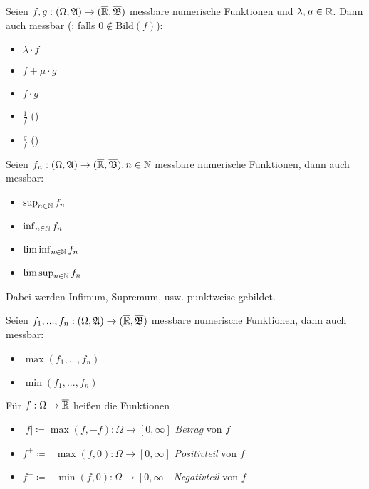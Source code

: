 \documentclass{cheat-sheet}
\newcommand{\ER}{\overline\R} %
\newcommand{\Alg}{\mathfrak{A}} %
\newcommand{\Bor}{\mathfrak{B}} %
\begin{document}
\begin{satz}
  Seien $f, g : (\Omega, \Alg) \to (\ER, \overline{\Bor})$ messbare numerische Funktionen und $\lambda, \mu \in \mathbb{R}$. Dann auch messbar (\ddag: falls $0 \not\in \mathrm{Bild}(f)$):
  \begin{multicols}{5}
    \begin{itemize}
      \item $\lambda \cdot f$
      \item $f + \mu \cdot g$
      \item $f \cdot g$
      \item $\tfrac{1}{f}$ (\ddag)
      \item $\tfrac{g}{f}$ (\ddag)
    \end{itemize}
  \end{multicols}
\end{satz}

\begin{satz}
  Seien $f_n : (\Omega, \Alg) \to (\ER, \overline{\Bor}), n \in \N$ messbare numerische Funktionen, dann auch messbar:
  \begin{multicols}{4}
    \begin{itemize}
      \item $\sup_{n \in \mathbb{N}} f_n$
      \item $\inf_{n \in \mathbb{N}} f_n$
      \item $\liminf_{n \in \mathbb{N}} f_n$
      \item $\limsup_{n \in \mathbb{N}} f_n$
    \end{itemize}
  \end{multicols}
  \vspace{4pt}
  Dabei werden Infimum, Supremum, usw. punktweise gebildet.
\end{satz}

\begin{satz}
  Seien $f_1, ..., f_n : (\Omega, \Alg) \to (\ER, \overline{\Bor})$ messbare numerische Funktionen, dann auch messbar:
  \begin{multicols}{2}
    \begin{itemize}
      \item $\max(f_1, ..., f_n)$
      \item $\min(f_1, ..., f_n)$
    \end{itemize}
  \end{multicols}
\end{satz}

\begin{defn}
  Für $f : \Omega \to \ER$ heißen die Funktionen
  \begin{itemize}
    \item $\left|f\right| \coloneqq \max(f, -f) : \Omega \to [0, \infty]$ \emph{Betrag} von $f$
    \item $f^+ \coloneqq \,\,\,\, \max(f, 0) : \Omega \to [0, \infty]$ \emph{Positivteil} von $f$
    \item $f^- \coloneqq -\min(f, 0) : \Omega \to [0, \infty]$ \emph{Negativteil} von $f$
  \end{itemize}
\end{defn}
\end{document}
